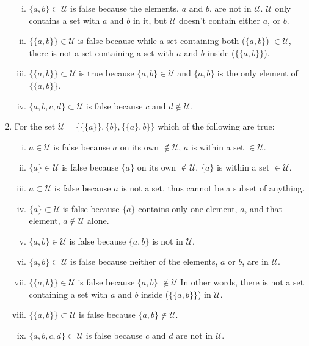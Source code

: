 \documentclass{article}
\begin{document}
\begin{enumerate}[1]
\begin{enumerate}[i.]
        \item $\{a, b\} \subset \mathscr{U}$ is false because the elements, $a$ and $b$, are not in $\mathscr{U}$. $\mathscr{U}$ only contains a set with $a$ and $b$ in it, but $\mathscr{U}$ doesn't contain either $a$, or $b$. 
        \item $\{\{a,b\}\} \in \mathscr{U}$ is false because while a set containing both ($\{a, b\}$) $\in \mathscr{U}$, there is not a set containing a set with $a$ and $b$ inside ($\{\{a, b\}\}$).
        \item $\{\{a,b\}\} \subset \mathscr{U}$ is true because $\{a, b\} \in \mathscr{U}$ and  $\{a, b\}$ is the only element of $\{\{a,b\}\}$.
        \item $\{a, b, c, d\} \subset \mathscr{U}$ is false because $c$ and $d \notin \mathscr{U}$.
    \end{enumerate}
    \setcounter{enumi}{6}
    \item For the set $\mathscr{U} = \{\{\{a\}\}, \{b\}, \{\{a\}, b\}\}$ which of the following are true:
    \begin{enumerate}[i.]
        \item $a \in \mathscr{U}$  is false because $a$ on its own $\notin \mathscr{U}$, $a$ is within a set $\in \mathscr{U}$.
        \item $\{a\} \in \mathscr{U}$  is false because $\{a\}$ on its own $\notin \mathscr{U}$, $\{a\}$ is within a set $\in \mathscr{U}$.
        \item $a \subset \mathscr{U}$ is false because $a$ is not a set, thus cannot be a subset of anything.
        \item $\{a\} \subset \mathscr{U}$ is false because $\{a\}$ contains only one element, $a$, and that element, $a \notin \mathscr{U}$ alone.
        \item $\{a, b\} \in \mathscr{U}$ is false because $\{a, b\}$ is not in $\mathscr{U}$. 
        \item $\{a, b\} \subset \mathscr{U}$ is false because neither of the elements, $a$ or $b$, are in $\mathscr{U}$.
        \item $\{\{a,b\}\} \in \mathscr{U}$ is false because $\{a, b\}$ $\notin \mathscr{U}$ In other words, there is not a set containing a set with $a$ and $b$ inside ($\{\{a, b\}\}$) in $\mathscr{U}$.
        \item $\{\{a,b\}\} \subset \mathscr{U}$ is false because $\{a, b\} \notin \mathscr{U}$.
        \item $\{a, b, c, d\} \subset \mathscr{U}$ is false because $c$ and $d$ are not in $\mathscr{U}$.
    \end{enumerate}
\end{enumerate}
\end{document}
